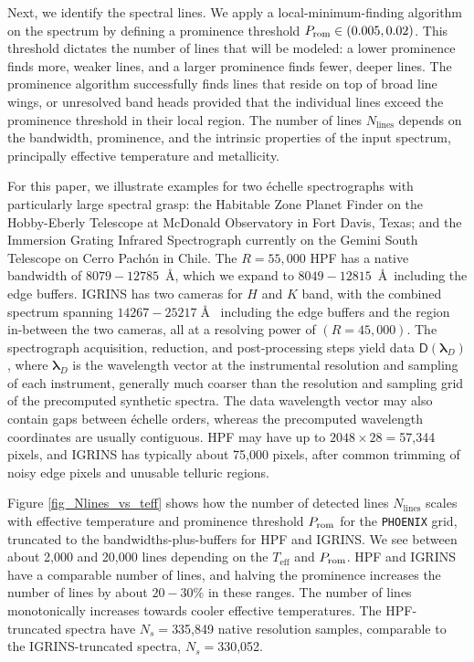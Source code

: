 \documentclass[twocolumn]{aastex631}
\begin{document}
Next, we identify the spectral lines. We apply a local-minimum-finding algorithm \citep{2020SciPy-NMeth} on the spectrum by defining a prominence threshold $P_{\rm rom} \in (0.005, 0.02)$. This threshold dictates the number of lines that will be modeled: a lower prominence finds more, weaker lines, and a larger prominence finds fewer, deeper lines. The prominence algorithm successfully finds lines that reside on top of broad line wings, or unresolved band heads provided that the individual lines exceed the prominence threshold in their local region. The number of lines $N_{\mathrm{lines}}$ depends on the bandwidth, prominence, and the intrinsic properties of the input spectrum, principally effective temperature and metallicity.

For this paper, we illustrate examples for two \'echelle spectrographs with particularly large spectral grasp: the Habitable Zone Planet Finder \citep[HPF,][]{2014SPIE.9147E..1GM} on the Hobby-Eberly Telescope at McDonald Observatory in Fort Davis, Texas; and the Immersion Grating Infrared Spectrograph \citep[IGRINS,][]{park14}
currently on the Gemini South Telescope on Cerro Pach\'on in Chile. The $R=55,000$ HPF has a native bandwidth of $8079-12785$~\AA, which we expand to $8049-12815$~\AA~including the edge buffers. IGRINS has two cameras for $H$ and $K$ band, with the combined spectrum spanning $14267-25217\;$\AA~ including the edge buffers and the region in-between the two cameras, all at a resolving power of $(R=45,000)$. The spectrograph acquisition, reduction, and post-processing steps yield data $\mathsf{D}(\bm{\lambda}_{D})$, where $\bm{\lambda}_{D}$ is the wavelength vector at the instrumental resolution and sampling of each instrument, generally much coarser than the resolution and sampling grid of the precomputed synthetic spectra. The data wavelength vector may also contain gaps between \'echelle orders, whereas the precomputed wavelength coordinates are usually contiguous. HPF may have up to $2048\times28=$57,344 pixels, and IGRINS has typically about 75,000 pixels, after common trimming of noisy edge pixels and unusable telluric regions.





Figure \ref{fig_Nlines_vs_teff} shows how the number of detected lines $N_{\mathrm{lines}}$ scales with effective temperature and prominence threshold $P_{\rm rom}$ for the \texttt{PHOENIX} grid, truncated to the bandwidths-plus-buffers for HPF and IGRINS. We see between about 2,000 and 20,000 lines depending on the $T_{\mathrm{eff}}$ and $P_{\rm rom}$. HPF and IGRINS have a comparable number of lines, and halving the prominence increases the number of lines by about $20-30\%$ in these ranges. The number of lines monotonically increases towards cooler effective temperatures.
The HPF-truncated spectra have $N_s=$335,849 native resolution samples, comparable to the IGRINS-truncated spectra, $N_s=$330,052.
\end{document}
